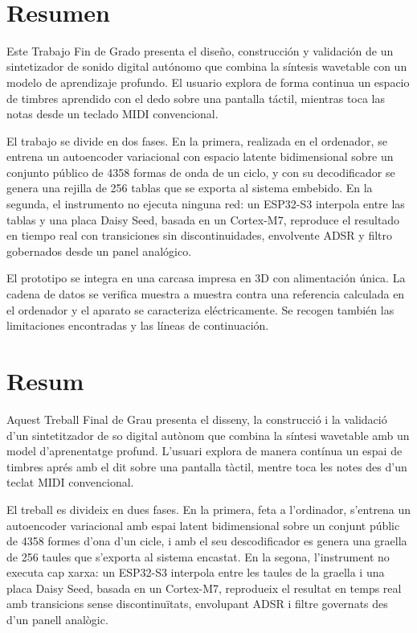 \documentclass[11pt,spanish,a4paper,hidelinks]{book}
\begin{document}
\renewcommand{\listtablename}{Índice de tablas} 
\renewcommand{\tablename}{Tabla} 
\newpage
\thispagestyle{empty}\ \\
\newpage
\thispagestyle{empty}

\section*{Resumen}
\noindent Este Trabajo Fin de Grado presenta el diseño, construcción y
validación de un sintetizador de sonido digital autónomo que combina la síntesis
wavetable con un modelo de aprendizaje profundo. El usuario explora de forma
continua un espacio de timbres aprendido con el dedo sobre una pantalla táctil,
mientras toca las notas desde un teclado MIDI convencional.

El trabajo se divide en dos fases. En la primera, realizada en el ordenador, se
entrena un autoencoder variacional con espacio latente bidimensional sobre un
conjunto público de 4358 formas de onda de un ciclo, y con su decodificador se
genera una rejilla de 256 tablas que se exporta al sistema embebido. En la
segunda, el instrumento no ejecuta ninguna red: un ESP32-S3 interpola entre las
tablas y una placa Daisy Seed, basada en un Cortex-M7, reproduce el resultado en
tiempo real con transiciones sin discontinuidades, envolvente ADSR y filtro
gobernados desde un panel analógico.

El prototipo se integra en una carcasa impresa en 3D con alimentación única. La
cadena de datos se verifica muestra a muestra contra una referencia calculada en
el ordenador y el aparato se caracteriza eléctricamente. Se recogen también las
limitaciones encontradas y las líneas de continuación.


\section*{Resum}
\noindent Aquest Treball Final de Grau presenta el disseny, la construcció i la
validació d'un sintetitzador de so digital autònom que combina la síntesi
wavetable amb un model d'aprenentatge profund. L'usuari explora de manera
contínua un espai de timbres aprés amb el dit sobre una pantalla tàctil, mentre
toca les notes des d'un teclat MIDI convencional.

El treball es divideix en dues fases. En la primera, feta a l'ordinador,
s'entrena un autoencoder variacional amb espai latent bidimensional sobre un
conjunt públic de 4358 formes d'ona d'un cicle, i amb el seu descodificador es
genera una graella de 256 taules que s'exporta al sistema encastat. En la
segona, l'instrument no executa cap xarxa: un ESP32-S3 interpola entre les
taules de la graella i una placa Daisy Seed, basada en un Cortex-M7, reprodueix
el resultat en temps real amb transicions sense discontinuïtats, envolupant ADSR
i filtre governats des d'un panell analògic.
\end{document}
